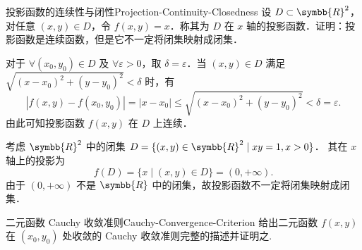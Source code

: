 \begin{problem}{投影函数的连续性与闭性}{Projection-Continuity-Closedness}
    设 $D \subset \symbb{R}^2$，对任意 $(x, y) \in D$，令 $f(x, y) = x$．称其为 $D$ 在 $x$ 轴的投影函数．证明：投影函数是连续函数，但是它不一定将闭集映射成闭集．
\end{problem}

\begin{myproof}

    对于 $\forall (x_0, y_0) \in D$ 及 $\forall \varepsilon > 0$，取 $\delta = \varepsilon$．当 $(x, y) \in D$ 满足 $\sqrt{(x - x_0)^2 + (y - y_0)^2} < \delta$ 时，有
    \begin{equation}
        |f(x, y) - f(x_0, y_0)| = |x - x_0| \le \sqrt{(x - x_0)^2 + (y - y_0)^2} < \delta = \varepsilon.
    \end{equation}
    由此可知投影函数 $f(x, y)$ 在 $D$ 上连续．


    考虑 $\symbb{R}^2$ 中的闭集 $D = \{(x, y) \in \symbb{R}^2 \mid xy = 1, x > 0\}$．
    其在 $x$ 轴上的投影为
    \begin{equation}
        f(D) = \{x \mid (x, y) \in D\} = (0, +\infty).
    \end{equation}
    由于 $(0, +\infty)$ 不是 $\symbb{R}$ 中的闭集，故投影函数不一定将闭集映射成闭集．
\end{myproof}


\begin{problem}{二元函数 Cauchy 收敛准则}{Cauchy-Convergence-Criterion}
    给出二元函数 $f(x, y)$ 在 $(x_0, y_0)$ 处收敛的 Cauchy 收敛准则完整的描述并证明之.
\end{problem}

